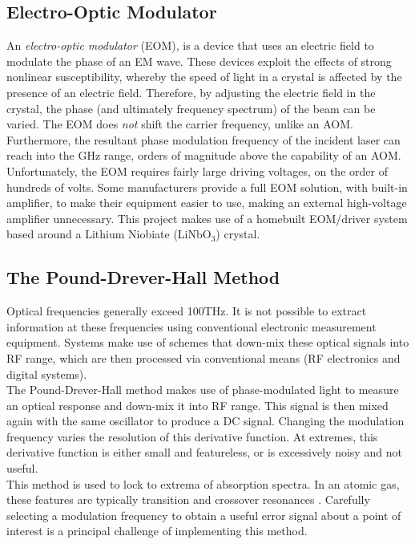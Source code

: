 \subsection{Electro-Optic Modulator}

An \emph{electro-optic modulator} (EOM), is a device that uses an electric field to modulate the phase of an EM wave.  These devices exploit the effects of strong nonlinear susceptibility, whereby the speed of light in a crystal is affected by the presence of an electric field.  Therefore, by adjusting the electric field in the crystal, the phase (and ultimately frequency spectrum) of the beam can be varied. The EOM does \emph{not} shift the carrier frequency, unlike an AOM. Furthermore, the resultant phase modulation frequency of the incident laser can reach into the GHz range, orders of magnitude above the
capability of an AOM.\\

Unfortunately, the EOM requires fairly large driving voltages, on the order of hundreds of volts.  Some manufacturers provide a full EOM solution, with built-in amplifier, to make their equipment easier to use, making an external high-voltage amplifier unnecessary. This project makes use of a homebuilt EOM/driver system based around a Lithium Niobiate (LiNbO$_3$) crystal.

\subsection{The Pound-Drever-Hall Method}

Optical frequencies generally exceed 100THz. It is not possible to extract information at these frequencies using conventional electronic measurement equipment. Systems make use of schemes that down-mix these optical signals into RF range, which are then processed via conventional means (RF electronics and digital systems). \\

The Pound-Drever-Hall method makes use of phase-modulated light to measure an optical response and down-mix it into RF range.  This signal is then mixed again with the same oscillator to produce a DC signal. Changing the modulation frequency varies the resolution of this derivative function. At extremes, this derivative function is either small and featureless, or is excessively noisy and not useful. \\

This method is used to lock to extrema of absorption spectra.  In an atomic gas, these features are typically transition and crossover resonances \cite{maguire2006}. Carefully selecting a modulation frequency to obtain a useful error signal about a point of interest is a principal challenge of implementing this method.

